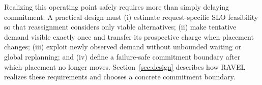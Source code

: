 Realizing this operating point safely requires more than simply delaying
commitment.
A practical design must
(i) estimate request-specific SLO feasibility so that reassignment considers
only viable alternatives;
(ii) make tentative demand visible exactly once and transfer its prospective
charge when placement changes;
(iii) exploit newly observed demand without unbounded waiting or global
replanning; and
(iv) define a failure-safe commitment boundary after which placement no longer
moves.
Section~\ref{sec:design} describes how RAVEL realizes these requirements and
chooses a concrete commitment boundary.
